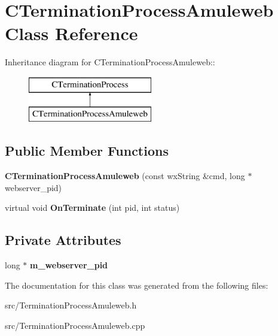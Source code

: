 \section{CTerminationProcessAmuleweb Class Reference}
\label{classCTerminationProcessAmuleweb}
Inheritance diagram for CTerminationProcessAmuleweb::\begin{figure}[H]
\begin{center}
\leavevmode
\includegraphics[height=2cm]{classCTerminationProcessAmuleweb}
\end{center}
\end{figure}
\subsection*{Public Member Functions}
\begin{DoxyCompactItemize}
\item 
{\bfseries CTerminationProcessAmuleweb} (const wxString \&cmd, long $\ast$webserver\_\-pid)\label{classCTerminationProcessAmuleweb_aab0fa9e48b236ad828935ba13a8bf5c3}

\item 
virtual void {\bfseries OnTerminate} (int pid, int status)\label{classCTerminationProcessAmuleweb_a66c5e3b23857a88f96a8d5e259aba7f5}

\end{DoxyCompactItemize}
\subsection*{Private Attributes}
\begin{DoxyCompactItemize}
\item 
long $\ast$ {\bfseries m\_\-webserver\_\-pid}\label{classCTerminationProcessAmuleweb_a4be6b5b7d8a31365b51750c75222c78a}

\end{DoxyCompactItemize}


The documentation for this class was generated from the following files:\begin{DoxyCompactItemize}
\item 
src/TerminationProcessAmuleweb.h\item 
src/TerminationProcessAmuleweb.cpp\end{DoxyCompactItemize}
